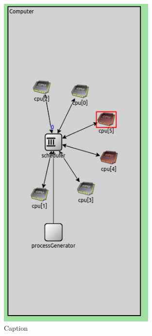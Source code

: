 \begin{figure}
    \centering
    \includegraphics[width=0.7\textwidth]{images/example/sim_schema.png}
    \caption{Caption}
    \label{fig:enter-label}
\end{figure}